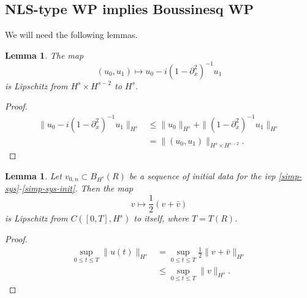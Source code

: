 \documentclass{amsart}
\newtheorem{lemma}[theorem]{Lemma}
\newcommand{\p}{\partial}
\begin{document}
\subsection{NLS-type WP implies Boussinesq WP} 
\label{ssec:wp-imp-wp}
We will need the following lemmas.
%
%
\begin{lemma}
  The map $$(u_{0}, u_{1}) \mapsto 
  u_{0} - i(1 - \p_{x}^{2})^{-1}u_{1}$$ is Lipschitz from $H^{s} \times
  H^{s-2}$ to $H^{s}$.
\label{lem:lip-init-data}
\end{lemma}
%
%
%
%
\begin{proof}
%
%
\begin{equation*}
\begin{split}
  \| u_{0} - i(1 - \p_{x}^{2})^{-1} u_{1} \|_{H^{s}} 
  & \le \| u_{0} \|_{H^{s}} + \| (1 - \p_{x}^{2})^{-1} u_{1} \|_{H^{s}}
  \\
  & = \| (u_{0}, u_{1}) \|_{H^{s} \times H^{s-2}}.
\end{split}
\end{equation*}
%
%
\end{proof}
%
%
%
%
%
%
%
%
%
%
\begin{lemma}
  Let $v_{0,n} \subset B_{H^{s}}(R)$ be a sequence of initial data for the ivp
  \eqref{simp-sys}-\eqref{simp-sys-init}. Then the map $$v \mapsto
  \frac{1}{2}(v + \bar{v})$$ is Lipschitz from $C([0, T], H^{s})$ to itself, where $T = T(R)$.  
\label{lem:lip-sol}
\end{lemma}
%
%
%
%
\begin{proof}
%
%
\begin{equation*}
\begin{split}
  \sup_{0 \le t \le T} \| u(t) \|_{H^{s}}
  & = \sup_{0 \le t \le T} \frac{1}{2} \| v + \bar v \|_{H^{s}}
  \\
  & \le \sup_{0 \le t \le T} \| v \|_{H^{s}}.
\end{split}
\end{equation*}
%
%
\end{proof}
\end{document}
